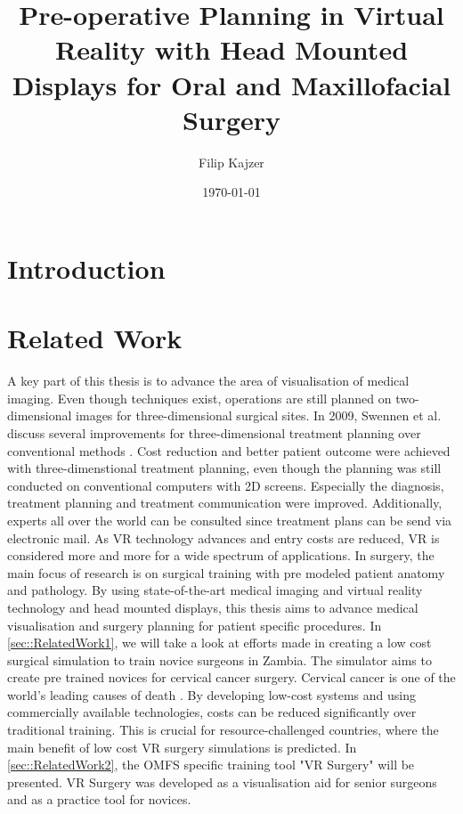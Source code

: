 \documentclass[twoside, parskip]{VRThesis} %
\title{Pre-operative Planning in Virtual Reality with Head Mounted Displays for Oral and Maxillofacial Surgery}
\author{Filip Kajzer}
\date{\today}
\begin{document}
 



\tableofcontents

\chapter{Introduction}



\chapter{Related Work}

A key part of this thesis is to advance the area of visualisation of medical imaging.
Even though techniques exist, operations are still planned on two-dimensional images for three-dimensional surgical sites.
In 2009, Swennen et al. discuss several improvements for three-dimensional treatment planning over conventional methods \cite{swennen2009three}.
Cost reduction and better patient outcome were achieved with three-dimenstional treatment planning, even though the planning was still conducted on conventional computers with 2D screens.
Especially the diagnosis, treatment planning and treatment communication were improved.
Additionally, experts all over the world can be consulted since treatment plans can be send via electronic mail.
As VR technology advances and entry costs are reduced, VR is considered more and more for a wide spectrum of applications.
In surgery, the main focus of research is on surgical training with pre modeled patient anatomy and pathology.
By using state-of-the-art medical imaging and virtual reality technology and head mounted displays, this thesis aims to advance medical visualisation and surgery planning for patient specific procedures.
In \ref{sec::RelatedWork1}, we will take a look at efforts made in creating a low cost surgical simulation to train novice surgeons in Zambia.
The simulator aims to create pre trained novices for cervical cancer surgery. 
Cervical cancer is one of the world's leading causes of death \cite{RN52}.
By developing low-cost systems and using commercially available technologies, costs can be reduced significantly over traditional training.
This is crucial for resource-challenged countries, where the main benefit of low cost VR surgery simulations is predicted.
In \ref{sec::RelatedWork2}, the OMFS specific training tool "VR Surgery" will be presented.
VR Surgery was developed as a visualisation aid for senior surgeons and as a practice tool for novices.   
\end{document}
